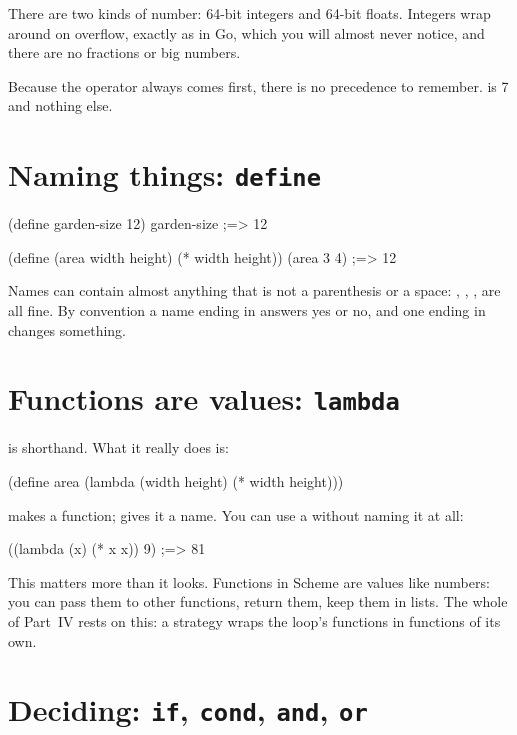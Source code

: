 There are two kinds of number: 64-bit integers and 64-bit floats. Integers
wrap around on overflow, exactly as in Go, which you will almost never
notice, and there are no fractions or big numbers.

Because the operator always comes first, there is no precedence to
remember.  is 7 and nothing else.

\section{Naming things: \texttt{define}}

\begin{scm}
(define garden-size 12)
garden-size                    ;=> 12

(define (area width height)
  (* width height))
(area 3 4)                     ;=> 12
\end{scm}

Names can contain almost anything that is not a parenthesis or a space:
, , ,  are
all fine. By convention a name ending in  answers yes or no, and one
ending in \code{!} changes something.

\section{Functions are values: \texttt{lambda}}

 is shorthand. What it really does is:

\begin{scm}
(define area
  (lambda (width height)
    (* width height)))
\end{scm}

 makes a function;  gives it a name. You can use
a  without naming it at all:

\begin{scm}
((lambda (x) (* x x)) 9)       ;=> 81
\end{scm}

This matters more than it looks. Functions in Scheme are values like
numbers: you can pass them to other functions, return them, keep them in
lists. The whole of Part~IV rests on this: a strategy wraps the loop's
functions in functions of its own.

\section{Deciding: \texttt{if}, \texttt{cond}, \texttt{and}, \texttt{or}}

